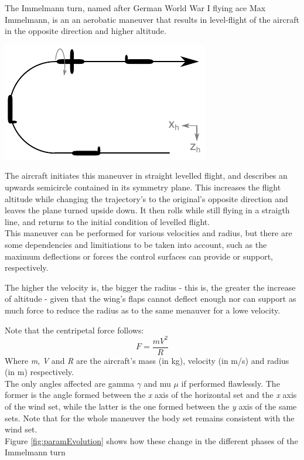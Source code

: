 \vspace{-0.5cm}
The Immelmann turn, named after German World War I flying ace Max Immelmann, is an an  aerobatic maneuver that results in level-flight of the aircraft in the opposite direction and higher altitude.

\includegraphics[width=\linewidth]{figures/immelmann-overview}
\vspace*{0.5cm}

The aircraft initiates this maneuver in straight levelled flight, and describes an upwards semicircle contained in its symmetry plane. This increases the flight altitude while changing the trajectory's to the original's opposite direction and leaves the plane turned upside down. It then rolls while still flying in a straigth line, and returns to the initial condition of levelled flight.\\

This maneuver can be performed for various velocities and radius, but there are some dependencies and limitiations to be taken into account, such as the maximum deflections or forces the control surfaces can provide or support, respectively. 

The higher the velocity is, the bigger the radius - this is, the greater the increase of altitude - given that the wing's flaps cannot deflect enough nor can support as much force to reduce the radius as to the same menauver for a lowe velocity.

Note that the centripetal force follows:
\[
	F=\frac{mV^2}{R}
\]
Where \textit{m}, \textit{V} and \textit{R} are the aircraft's mass (in kg), velocity (in m/s) and radius (in m) respectively. \\

The only angles affected are gamma $\gamma$ and mu $\mu$ if performed flawlessly. The former is the angle formed between the \textit{x} axis of the horizontal set and the \textit{x} axis of the wind set, while the latter is the one formed between the \textit{y} axis of the same sets. Note that for the whole maneuver the body set remains consistent with the wind set.\\
Figure \ref{fig:paramEvolution} shows how these change in the different phases of the Immelmann turn\\

